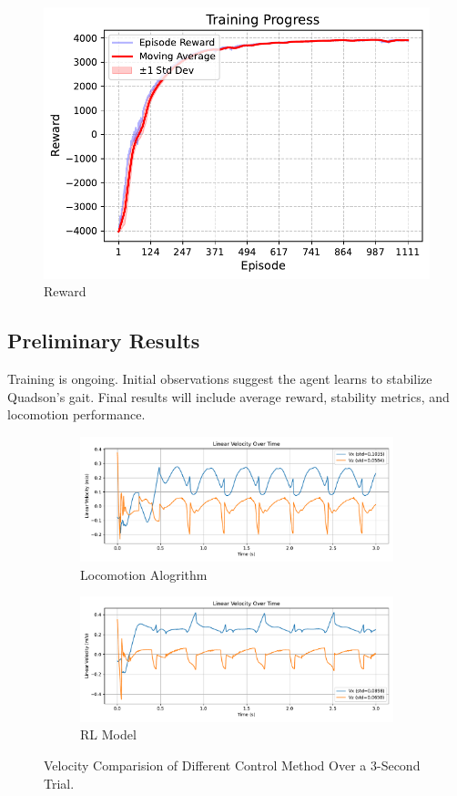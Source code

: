 \documentclass[a4paper,11pt]{article}
\begin{document}
\begin{figure}[H]
  \centering
	\includegraphics[width=0.6\linewidth]{../../assets/rl_training_progress.pdf}
  \caption{Reward}
  \label{fig:reward}
\end{figure}

\subsection{Preliminary Results}

Training is ongoing. Initial observations suggest the agent learns to stabilize Quadson's gait. Final results will include average reward, stability metrics, and locomotion performance.

\begin{figure}[H]
	\centering
	\begin{subfigure}[b]{\textwidth}
    \includegraphics[width=0.9\linewidth]{../../assets/alg_vel.pdf}
    \caption{Locomotion Alogrithm}
  \end{subfigure}
  \hfill
  \begin{subfigure}[b]{\textwidth}
    \includegraphics[width=0.9\linewidth]{../../assets/model_vel.pdf}
    \caption{RL Model}
  \end{subfigure}
  \caption{Velocity Comparision of Different Control Method Over a 3-Second Trial.}
  \label{fig:compare_vel}
\end{figure}
\end{document}
